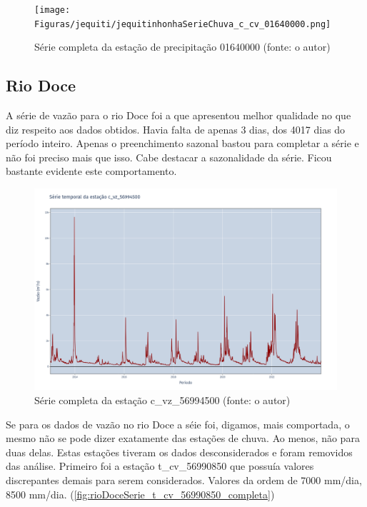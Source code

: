 \begin{figure}[!h]
\centering
\texttt{[image: Figuras/jequiti/jequitinhonhaSerieChuva\_c\_cv\_01640000.png]}
\caption{Série completa da estação de precipitação 01640000 (fonte: o autor)}
\label{fig:jequitinhonhaSerieChuva_c_cv_01640000}
\end{figure}

\subsection{Rio Doce}

A série de vazão para o rio Doce foi a que apresentou melhor qualidade no que diz respeito aos dados obtidos. Havia falta de apenas 3 dias, dos 4017 dias do período inteiro. Apenas o preenchimento sazonal bastou para completar a série e não foi preciso mais que isso. Cabe destacar a sazonalidade da série. Ficou bastante evidente este comportamento.

\begin{figure}[!h]
\centering
\includegraphics[scale=0.25]{Figuras/rio_doce/rioDoceSerie_c_vz_56994500_completa.png}
\caption{Série completa da estação c\_vz\_56994500 (fonte: o autor)}
\label{fig:rioDoceSerie_c_vz_56994500_completa}
\end{figure}

Se para os dados de vazão no rio Doce a séie foi, digamos, mais comportada, o mesmo não se pode dizer exatamente das estações de chuva. Ao menos, não para duas delas. Estas estações tiveram os dados desconsiderados e foram removidos das análise. Primeiro foi a estação t\_cv\_56990850 que possuía valores discrepantes demais para serem considerados. Valores da ordem de 7000 mm/dia, 8500 mm/dia. (\ref{fig:rioDoceSerie_t_cv_56990850_completa})

